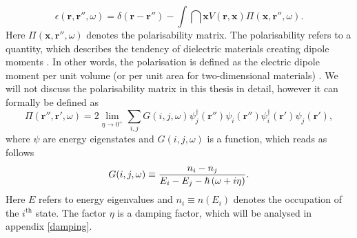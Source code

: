 \begin{equation}\label{eq:eps_r_r_omega}
    \epsilon(\mathbf{r},\mathbf{r}'',\omega) = \delta(\mathbf{r}-\mathbf{r''})-\int\dint\mathbf{x}V(\mathbf{r},\mathbf{x})\Pi(\mathbf{x},\mathbf{r}'',\omega).
\end{equation}
Here $\Pi(\mathbf{x},\mathbf{r}'',\omega)$ denotes the polarisability matrix. The polarisability refers to a quantity, which describes the tendency of dielectric materials creating dipole moments \cite{Quinn2018}. In other words, the polarisation is defined as the electric dipole moment per unit volume (or per unit area for two-dimensional materials) \cite{Quinn2018}. We will not discuss the polarisability matrix in this thesis in detail, however it can formally be defined as \cite{Westerhout2018}
\begin{equation}\label{eq:pi_damp}
    \Pi(\mathbf{r}'',\mathbf{r}',\omega) = 2 \lim_{\eta\to 0^+}\sum_{i,j} G(i,j,\omega)\psi_j^\dagger (\mathbf{r}'')\psi_i (\mathbf{r}'')\psi_i^\dagger (\mathbf{r}')\psi_j (\mathbf{r}'),
\end{equation}
where $\psi$ are energy eigenstates and $G(i,j,\omega)$ is a function, which reads as follows
\begin{equation}\label{eq:green_damp}
    G(i,j,\omega) \equiv \frac{n_i-n_j}{E_i-E_j-\hbar\left(\omega+i\eta\right)}.
\end{equation}
Here $E$ refers to energy eigenvalues and $n_i \equiv n(E_i)$ denotes the occupation of the $i^\mathrm{th}$ state. The factor $\eta$ is a damping factor, which will be analysed in appendix \ref{damping}.

